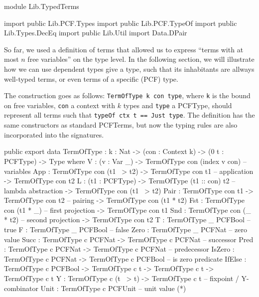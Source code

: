 \begin{hidden}
module Lib.TypedTerms

import public Lib.PCF.Types
import public Lib.PCF.TypeOf
import public Lib.Types.DecEq
import public Lib.Util
import Data.DPair


\end{hidden}

So far, we used a definition of terms that allowed us to express ``terms with at most $n$ free variables'' on the type level. In the following section, we will illustrate how we can use dependent types give a type, such that its inhabitants are allways well-typed terms, or even terms of a specific (PCF) type.

The construction goes as follows: \texttt{TermOfType k con type}, where \texttt{k} is the bound on free variables, \texttt{con} a context with $k$ types and \texttt{type} a PCFType, should represent all terms  such that \texttt{typeOf ctx t == Just type}.
The definition has the same constructors as standard PCFTerms, but now the typing rules are also incorporated into the
signatures.

\begin{code}
public export
data TermOfType : {k : Nat} -> (con : Context k) -> (0 t : PCFType) -> Type where
    V    : (v : Var _)  -> TermOfType con (index v con)            -- variables
    App  : TermOfType con (t1 ~> t2)  -> TermOfType con t1         -- application
            -> TermOfType con t2  
    L    : (t1 : PCFType)         -> TermOfType (t1 :: con) t2     -- lambda abstraction
            -> TermOfType con (t1 ~> t2)   
    Pair : TermOfType con t1 -> TermOfType con t2                  -- pairing
            -> TermOfType con (t1 * t2)
    Fst   : TermOfType con (t1 * _)                                -- first projection
            -> TermOfType con t1
    Snd   : TermOfType con (_ * t2)                                -- second projection
            -> TermOfType con t2
    T    : TermOfType _ PCFBool                                    -- true
    F    : TermOfType _ PCFBool                                    -- false
    Zero : TermOfType _ PCFNat                                     -- zero value
    Succ : TermOfType c PCFNat -> TermOfType c PCFNat              -- successor
    Pred : TermOfType c PCFNat -> TermOfType c PCFNat              -- predecessor
    IsZero : TermOfType c PCFNat -> TermOfType c PCFBool           -- is zero predicate
    IfElse : TermOfType c PCFBool -> TermOfType c t -> TermOfType c t
                  -> TermOfType c t
    Y     : TermOfType c (t ~> t) -> TermOfType c t                -- fixpoint / Y-combinator
    Unit  : TermOfType c PCFUnit                                   -- unit value (*)
\end{code}

